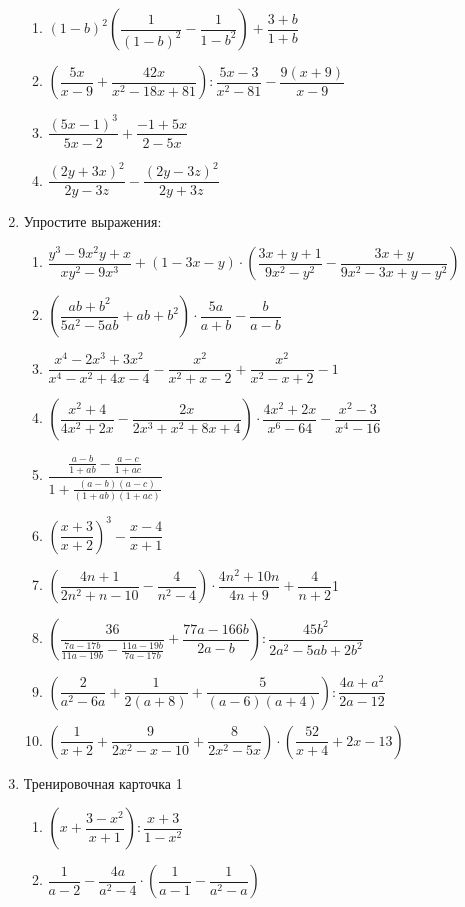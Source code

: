 \documentclass[12pt, a4paper]{article}
\begin{document}
\begin{enumerate}
\begin{enumerate}[label=\asbuk*)]
 			\item \((1-b)^2\left( \dfrac{1}{(1-b)^2}-\dfrac{1}{1-b^2} \right)+\dfrac{3+b}{1+b}\)
 			\item \(\left( \dfrac{5x}{x-9} +\dfrac{42x}{x^2-18x+81}\right):\dfrac{5x-3}{x^2-81}-\dfrac{9(x+9)}{x-9}\)
 			\item \(\dfrac{(5x-1)^3}{5x-2}+\dfrac{-1+5x}{2-5x}\)
 			\item \(\dfrac{(2y+3x)^2}{2y-3z}-\dfrac{(2y-3z)^2}{2y+3z}\)
 		\end{enumerate}
 		\item Упростите выражения:
 			\begin{enumerate}[label=\asbuk*)]
 				\item \(\dfrac{y^3-9x^2y+x}{xy^2-9x^3}+(1-3x-y)\cdot\left( \dfrac{3x+y+1}{9x^2-y^2}-\dfrac{3x+y}{9x^2-3x+y-y^2} \right)\)
 				\item \(\left( \dfrac{ab+b^2}{5a^2-5ab}+ab+b^2 \right)\cdot\dfrac{5a}{a+b}-\dfrac{b}{a-b}\)
 				\item \(\dfrac{x^4-2x^3+3x^2}{x^4-x^2+4x-4}-\dfrac{x^2}{x^2+x-2}+\dfrac{x^2}{x^2-x+2}-1\)
 				\item \(\left( \dfrac{x^2+4}{4x^2+2x}-\dfrac{2x}{2x^3+x^2+8x+4} \right)\cdot\dfrac{4x^2+2x}{x^6-64}-\dfrac{x^2-3}{x^4-16}\)
 				\item \(\dfrac{\frac{a-b}{1+ab}-\frac{a-c}{1+ac}}{1+\frac{(a-b)(a-c)}{(1+ab)(1+ac)}}\)
 				\item \(\left( \dfrac{x+3}{x+2} \right)^3-\dfrac{x-4}{x+1}\)
 				\item \(\left( \dfrac{4n+1}{2n^2+n-10}-\dfrac{4}{n^2-4} \right)\cdot\dfrac{4n^2+10n}{4n+9}+\dfrac{4}{n+2}\)1
 				\item \(\left( \dfrac{36}{\frac{7a-17b}{11a-19b}-\frac{11a-19b}{7a-17b}}+\dfrac{77a-166b}{2a-b} \right):\dfrac{45b^2}{2a^2-5ab+2b^2}\)
 				\item \(\left( \dfrac{2}{a^2-6a}+\dfrac{1}{2(a+8)}+\dfrac{5}{(a-6)(a+4)} \right):\dfrac{4a+a^2}{2a-12}\)
 				\item \(\left( \dfrac{1}{x+2}+\dfrac{9}{2x^2-x-10}+\dfrac{8}{2x^2-5x} \right)\cdot\left( \dfrac{52}{x+4}+2x-13 \right)\)
 			\end{enumerate}	
 		\item Тренировочная карточка 1
 				\begin{enumerate}[label=\asbuk*)]
 					\item \(\left( x+\dfrac{3-x^2}{x+1} \right):\dfrac{x+3}{1-x^2}\)
 					\item \(\dfrac{1}{a-2}-\dfrac{4a}{a^2-4}\cdot\left( \dfrac{1}{a-1}-\dfrac{1}{a^2-a} \right)\)

\end{enumerate}
\end{enumerate}
\end{document}
